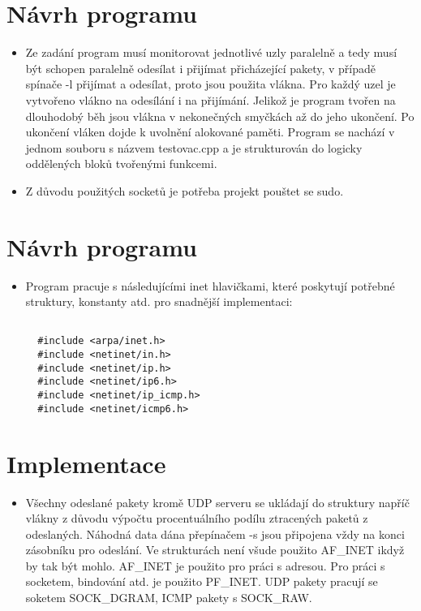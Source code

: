 \documentclass[a4paper,11pt]{article}
\begin{document}
\section*{Návrh programu}
\begin{itemize}
  \item Ze zadání program musí monitorovat jednotlivé uzly paralelně a tedy musí být schopen paralelně odesílat i přijímat přicházející pakety, v případě spínače -l přijímat a odesílat, proto jsou použita vlákna.
  Pro každý uzel je vytvořeno vlákno na odesílání i na přijímání. Jelikož je program tvořen na dlouhodobý běh jsou vlákna v nekonečných smyčkách až do jeho ukončení. Po ukončení vláken dojde k uvolnění alokované paměti.
  Program se nachází v jednom souboru s názvem testovac.cpp a je strukturován do logicky oddělených bloků tvořenými funkcemi.
  \item Z důvodu použitých socketů je potřeba projekt pouštet se sudo.
\end{itemize}

\section*{Návrh programu}
\begin{itemize}
  \item Program pracuje s následujícími inet hlavičkami, které poskytují potřebné struktury, konstanty atd. pro snadnější implementaci:

  \lstset{language=C++}
  \begin{lstlisting}[frame=single,breaklines]

  #include <arpa/inet.h>
  #include <netinet/in.h>
  #include <netinet/ip.h>
  #include <netinet/ip6.h>
  #include <netinet/ip_icmp.h>
  #include <netinet/icmp6.h>

  \end{lstlisting}
\end{itemize}

\section*{Implementace}
\begin{itemize}
  \item Všechny odeslané pakety kromě UDP serveru se ukládají do struktury napříč vlákny z důvodu výpočtu procentuálního podílu ztracených paketů z odeslaných. Náhodná data dána přepínačem -s jsou připojena vždy na konci zásobníku pro odeslání.
  Ve strukturách není všude použito AF\_INET ikdyž by tak být mohlo. AF\_INET je použito pro práci s adresou. Pro práci s socketem, bindování atd. je použito PF\_INET. UDP pakety pracují se soketem SOCK\_DGRAM, ICMP pakety s SOCK\_RAW.
\end{itemize}
\end{document}
